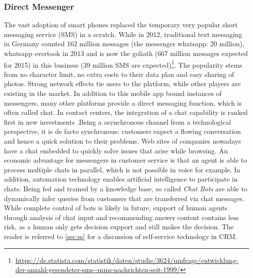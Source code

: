 		\subsubsection{Direct Messenger}
		The vast adoption of smart phones replaced the temporary very popular short messaging service (SMS) in a scratch.  While in 2012, traditional text messaging in Germany counted 162 million messages (the messenger whatsapp: 20 million), whatsapp overtook in 2013 and is now the goliath (667 million messages expected for 2015) in this business (39 million SMS are expected)\footnote{\cf \url{https://de.statista.com/statistik/daten/studie/3624/umfrage/entwicklung- der-anzahl-gesendeter-sms--mms-nachrichten-seit-1999/}}. The popularity stems from no character limit, no extra costs to their data plan and easy sharing of photos. Strong network effects tie users to the platform, while other players are existing in the market. In addition to this mobile app bound instances of messengers, many other platforms provide a direct messaging function, which is often called chat. In contact centers, the integration of a chat capability is ranked first in new investments \citep{ccnet2016.}.Being a asynchronous channel from a technological perspective, it is de facto synchronous: customers expect a flowing conversation and hence a quick solution to their problems. Web sites of companies nowadays have a chat embedded to quickly solve issues that arise while browsing. An economic advantage for messengers in customer service is that an agent is able to process multiple chats in parallel, which is not possible in voice for example. In addition, automation technology enables artificial intelligence to participate in chats. Being fed and trained by a knowledge base, so called \textit{Chat Bots} are able to dynamically infer queries from customers that are transferred via chat messages. While complete control of bots is likely in future, support of human agents through analysis of chat input and recommending answer content contains less risk, as a human only gets decision support and still makes the decision. The reader is referred to \ref{sec:ss} for a discussion of self-service technology in \acrshort{CRM}.  
		

